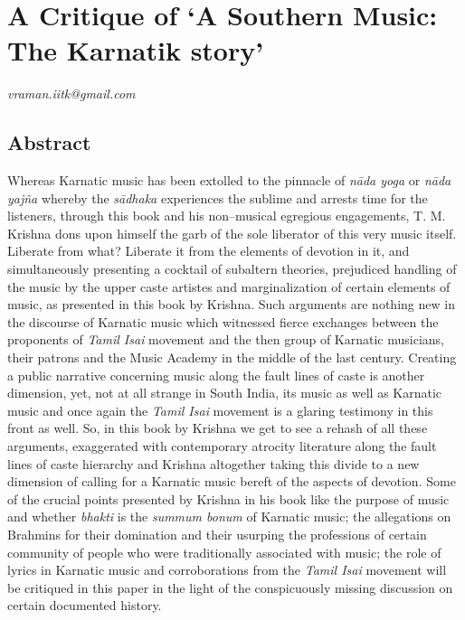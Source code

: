 
\chapter{A Critique of ‘A Southern Music: The Karnatik story’}\label{chapter6}


\begin{flushright}
\textit{vraman.iitk@gmail.com}
\end{flushright}


\section*{Abstract}

Whereas Karnatic music has been extolled to the pinnacle of \textit{nāda yoga} or \textit{nāda yajña} whereby the \textit{sādhaka} experiences the sublime and arrests time for the listeners, through this book and his non–musical egregious engagements, T. M. Krishna dons upon himself the garb of the sole liberator of this very music itself. Liberate from what? Liberate it from the elements of devotion in it, and simultaneously presenting a cocktail of subaltern theories, prejudiced handling of the music by the upper caste artistes and marginalization of certain elements of music, as presented in this book by Krishna. Such arguments are nothing new in the discourse of Karnatic music which witnessed fierce exchanges between the proponents of \textit{Tamil Isai} movement and the then group of Karnatic musicians, their patrons and the Music Academy in the middle of the last century. Creating a public narrative concerning music along the fault lines of caste is another dimension, yet, not at all strange in South India, its music as well as Karnatic music and once again the \textit{Tamil Isai} movement is a glaring testimony in this front as well. So, in this book by Krishna we get to see a rehash of all these arguments, exaggerated with contemporary atrocity literature along the fault lines of caste hierarchy and Krishna altogether taking this divide to a new dimension of calling for a Karnatic music bereft of the aspects of devotion. Some of the crucial points presented by Krishna in his book like the purpose of music and whether \textit{bhakti} is the \textit{summum bonum} of Karnatic music; the allegations on Brahmins for their domination and their usurping the professions of certain community of people who were traditionally associated with music; the role of lyrics in Karnatic music and corroborations from the \textit{Tamil Isai} movement will be critiqued in this paper in the light of the conspicuously missing discussion on certain documented history.

